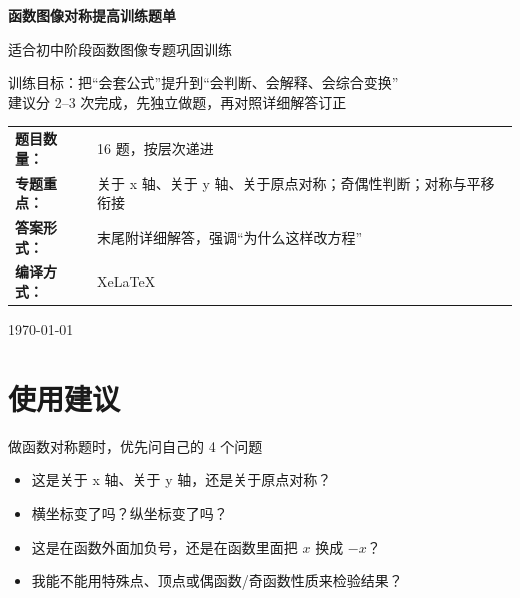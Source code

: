 \documentclass[11pt,a4paper,fontset=fandol]{ctexart}
\theoremstyle{formalexample}
\begin{document}
\thispagestyle{empty}
\begin{titlepage}
\centering
\vspace*{0.9cm}
\begin{tcolorbox}[
  enhanced,
  width=0.92\textwidth,
  colback=white,
  colframe=mainblue,
  boxrule=1pt,
  arc=0mm,
  left=6mm,
  right=6mm,
  top=8mm,
  bottom=8mm
]
\centering
{\fontsize{24}{30}\selectfont\bfseries 函数图像对称提高训练题单\par}
\vspace{0.6cm}
{\fontsize{17}{22}\selectfont 适合初中阶段函数图像专题巩固训练\par}

\vspace{1cm}
\begin{tcolorbox}[colback=lightblue,colframe=mainblue,width=0.84\textwidth,boxrule=1pt]
\centering
{\large 训练目标：把“会套公式”提升到“会判断、会解释、会综合变换”}\\[0.35em]
{\normalsize 建议分 2--3 次完成，先独立做题，再对照详细解答订正}
\end{tcolorbox}

\vspace{1cm}
\renewcommand{\arraystretch}{1.42}
\begin{tabular}{>{\bfseries}p{3.5cm}p{8cm}}
题目数量： & 16 题，按层次递进 \\
专题重点： & 关于 x 轴、关于 y 轴、关于原点对称；奇偶性判断；对称与平移衔接 \\
答案形式： & 末尾附详细解答，强调“为什么这样改方程” \\
编译方式： & XeLaTeX \\
\end{tabular}

\vspace{0.9cm}
{\large \today\par}
\end{tcolorbox}
\end{titlepage}

\tableofcontents
\newpage

\section{使用建议}

\begin{goalbox}{做函数对称题时，优先问自己的 4 个问题}
\begin{itemize}
  \item 这是关于 x 轴、关于 y 轴，还是关于原点对称？
  \item 横坐标变了吗？纵坐标变了吗？
  \item 这是在函数外面加负号，还是在函数里面把 $x$ 换成 $-x$？
  \item 我能不能用特殊点、顶点或偶函数/奇函数性质来检验结果？
\end{itemize}
\end{goalbox}
\end{document}
